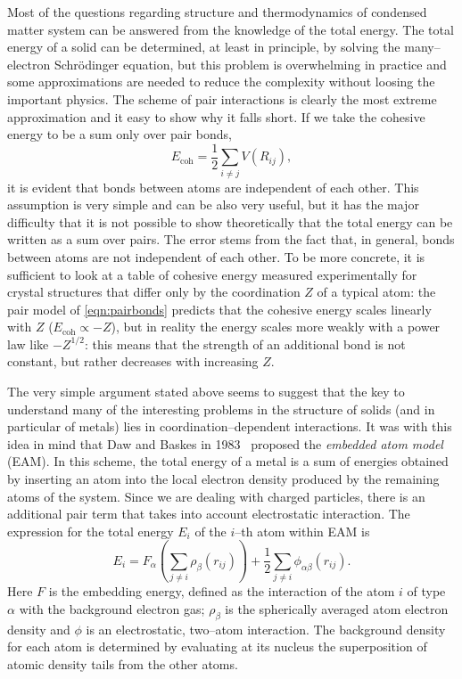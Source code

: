 Most of the questions regarding structure and thermodynamics of condensed matter system can be answered from the knowledge of the total energy. The total energy of a solid can be determined, at least in principle, by solving the many--electron Schr\"{o}dinger equation, but this problem is overwhelming in practice and some approximations are needed to reduce the complexity without loosing the important physics. The scheme of pair interactions is clearly the most extreme approximation and it easy to show why it falls short. If we take the cohesive energy to be a sum only over pair bonds,
\begin{equation}
    \label{eqn:pairbonds}
    E_{\text{coh}}= \frac{1}{2} \sum_{i\neq j} V(R_{ij}),
\end{equation}
it is evident that bonds between atoms are independent of each other. This assumption is very simple and can be also very useful, but it has the major difficulty that it is not possible to show theoretically that the total energy can be written as a sum over pairs. The error stems from the fact that, in general, bonds between atoms are not independent of each other. To be more concrete, it is sufficient to look at a table of cohesive energy measured experimentally for crystal structures that differ only by the coordination $Z$ of a typical atom: the pair model of \cref{eqn:pairbonds} predicts that the cohesive energy scales linearly with $Z$ ($E_{\text{coh}} \propto -Z$), but in reality the energy scales more weakly with a power law like $-Z^{1/2}$: this means that the strength of an additional bond is not constant, but rather decreases with increasing $Z$.

The very simple argument stated above seems to suggest that the key to understand many of the interesting problems in the structure of solids (and in particular of metals) lies in coordination--dependent interactions. It was with this idea in mind that Daw and Baskes in 1983~\cite{Daw1983EAM,Daw1984EAM} proposed the \textit{embedded atom model} (EAM). In this scheme, the total energy of a metal is a sum of energies obtained by inserting an atom into the local electron density produced by the remaining atoms of the system. Since we are dealing with charged particles, there is an additional pair term that takes into account electrostatic interaction. The expression for the total energy $E_i$ of the $i$--th atom within EAM is
\begin{equation}
    \label{eqn:EAM1}
    E_i= F_\alpha\left(\sum_{j\neq i} \rho_\beta (r_{ij}) \right) + \frac{1}{2} \sum_{j\neq i} \phi_{\alpha\beta}(r_{ij}).
\end{equation}
Here $F$ is the embedding energy, defined as the interaction of the atom $i$ of type $\alpha$ with the background electron gas; $\rho_\beta$ is the spherically averaged atom electron density and $\phi$ is an electrostatic, two--atom interaction. The background density for each atom is determined by evaluating at its nucleus the superposition of atomic density tails from the other atoms.

